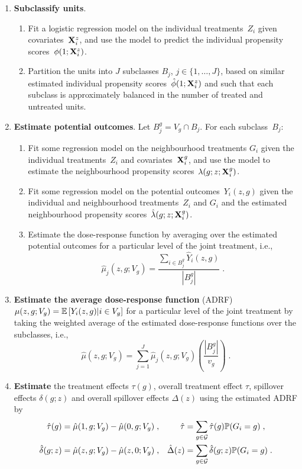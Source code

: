 \documentclass[10pt]{article}
\begin{document}
\begin{enumerate}

\item
\textbf{Subclassify units}.
\begin{enumerate}
\item
Fit a logistic regression model on the individual treatments~$Z_i$ given covariates~$\mathbf{X}_i^z$, and use the model to predict the individual propensity scores~$\phi(1;\mathbf{X}_i^z)$.
\item
Partition the units into $J$ subclasses $B_j$, $j\in\{1,\ldots,J\}$, based on similar estimated individual propensity scores~$\hat{\phi}(1;\mathbf{X}_i^z)$ and such that each subclass is approximately balanced in the number of treated and untreated units.
\end{enumerate}

\item
\textbf{Estimate potential outcomes}. Let $B_j^g=	V_g\cap B_j$. For each subclass~$B_j$:
\begin{enumerate}
\item
Fit some regression model on the neighbourhood treatments $G_i$ given the individual treatments~$Z_i$ and covariates~$\mathbf{X}_i^g$, and use the model to estimate the neighbourhood propensity scores~$\lambda(g;z;\mathbf{X}_i^g)$.
\item
Fit some regression model on the potential outcomes~$Y_i(z,g)$ given the individual and neighbourhood treatments~$Z_i$ and $G_i$ and the estimated neighbourhood propensity scores~$\hat{\lambda}(g;z;\mathbf{X}_i^g)$.
\item
Estimate the dose-response function by averaging over the estimated potential outcomes for a particular level of the joint treatment, i.e.,
\[
\hat{\mu}_j(z,g;V_g) = \frac{\sum_{i\in B_j^g}\hat{Y}_i(z,g)}{\left|B_j^g\right|}\;.
\]
\end{enumerate}

\item
\textbf{Estimate the average dose-response function} (ADRF) $\mu(z,g;V_g)=\mathbb{E}\left[Y_i(z,g)|i\in V_g\right]$ for a particular level of the joint treatment by taking the weighted average of the estimated dose-response functions over the subclasses, i.e.,
\[
\hat{\mu}(z,g;V_g) = \sum_{j=1}^J\hat{\mu}_j(z,g;V_g)\left(\frac{\left|B_j^g\right|}{v_g}\right) \;.
\]

\item
\textbf{Estimate} the treatment effects $\tau(g)$, overall treatment effect $\tau$, spillover effects $\delta(g;z)$ and overall spillover effects $\Delta(z)$ using the estimated ADRF by
\begin{align*}
\hat{\tau}(g) &= \hat{\mu}(1,g;V_g) - \hat{\mu}(0,g;V_g) \;, & \hat{\tau}&=\sum_{g\in\mathcal{G}}\hat{\tau}(g)\mathbb{P}(G_i=g) \;, \\
\hat{\delta}(g;z) &= \hat{\mu}(z,g;V_g) - \hat{\mu}(z,0;V_g) \;, & \hat{\Delta}(z) &= \sum_{g\in\mathcal{G}}\hat{\delta}(g;z)\mathbb{P}(G_i=g)\;.
\end{align*}

\end{enumerate}
\end{document}

